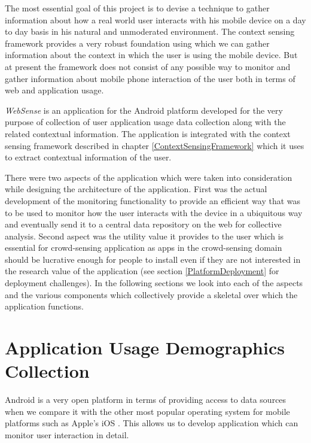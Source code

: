 \documentclass[12pt]{report}
\begin{document}
The most essential goal of this project is to devise a technique to gather information about how a real world user interacts with his mobile device on a day to day basis in his natural and unmoderated environment. The context sensing framework provides a very robust foundation using which we can gather information about the context in which the user is using the mobile device. But at present the framework does not consist of any possible way to monitor and gather information about mobile phone interaction of the user both in terms of web and application usage.

\textit{WebSense} is an application for the Android platform developed for the very purpose of collection of user application usage data collection along with the related contextual information. The application is integrated with the context sensing framework described in chapter \ref{ContextSensingFramework} which it uses to extract contextual information of the user.

There were two aspects of the application which were taken into consideration while designing the architecture of the application. First was the actual development of the monitoring functionality to provide an efficient way that was to be used to monitor how the user interacts with the device in a ubiquitous way and eventually send it to a central data repository on the web for collective analysis. Second aspect was the utility value it provides to the user which is essential for crowd-sensing application as apps in the crowd-sensing domain should be lucrative enough for people to install even if they are not interested in the research value of the application (see section \ref{PlatformDeployment} for deployment challenges). In the following sections we look into each of the aspects and the various components which collectively provide a skeletal over which the application functions.

\section{Application Usage Demographics Collection}

Android is a very open platform in terms of providing access to data sources when we compare it with the other most popular operating system for mobile platforms such as Apple's iOS \cite{AppleiOSPolicy}. This allows us to develop application which can monitor user interaction in detail.
\end{document}
